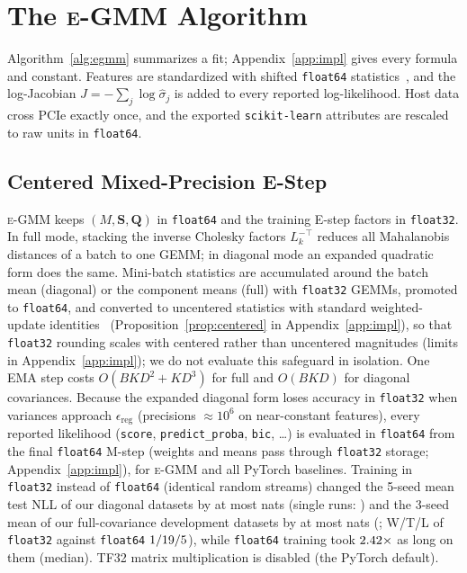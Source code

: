 \documentclass[10pt]{article} %
\newcommand{\egmm}{\textsc{e-GMM}}
\begin{document}
\section{The \egmm{} Algorithm}
\label{sec:method}

Algorithm~\ref{alg:egmm} summarizes a fit; Appendix~\ref{app:impl} gives every formula and constant. Features are standardized with shifted \texttt{float64} statistics~\citep{chan1983updating}, and the log-Jacobian $J = -\sum_j \log \hat{\sigma}_j$ is added to every reported log-likelihood. Host data cross PCIe exactly once, and the exported \texttt{scikit-learn} attributes are rescaled to raw units in \texttt{float64}.

\subsection{Centered Mixed-Precision E-Step}
\label{sec:method_estep}

\egmm{} keeps $(M, \mathbf{S}, \mathbf{Q})$ in \texttt{float64} and the training E-step factors in \texttt{float32}. In full mode, stacking the inverse Cholesky factors $L_k^{-\top}$ reduces all Mahalanobis distances of a batch to one GEMM; in diagonal mode an expanded quadratic form does the same. Mini-batch statistics are accumulated around the batch mean (diagonal) or the component means (full) with \texttt{float32} GEMMs, promoted to \texttt{float64}, and converted to uncentered statistics with standard weighted-update identities~\citep{west1979updating,chan1983updating,pebay2008formulas,schubert2018numerically} (Proposition~\ref{prop:centered} in Appendix~\ref{app:impl}), so that \texttt{float32} rounding scales with centered rather than uncentered magnitudes (limits in Appendix~\ref{app:impl}); we do not evaluate this safeguard in isolation. One EMA step costs $O(BKD^2 + KD^3)$ for full and $O(BKD)$ for diagonal covariances. Because the expanded diagonal form loses accuracy in \texttt{float32} when variances approach $\epsilon_{\mathrm{reg}}$ (precisions $\approx 10^6$ on near-constant features), every reported likelihood (\texttt{score}, \texttt{predict\_proba}, \texttt{bic}, \dots) is evaluated in \texttt{float64} from the final \texttt{float64} M-step (weights and means pass through \texttt{float32} storage; Appendix~\ref{app:impl}), for \egmm{} and all PyTorch baselines. Training in \texttt{float32} instead of \texttt{float64} (identical random streams) changed the 5-seed mean test NLL of our \rPrecN{} diagonal datasets by at most \rPrecMax{} nats (single runs: \rPrecRunMax{}) and the 3-seed mean of our \rSFsixtyfourN{} full-covariance development datasets by at most \rSFsixtyfourMaxAbs{} nats (\texttt{\rSFsixtyfourMaxName}; W/T/L of \texttt{float32} against \texttt{float64} $1/19/5$), while \texttt{float64} training took $2.42\times$ as long on them (median). TF32 matrix multiplication is disabled (the PyTorch default).
\end{document}
